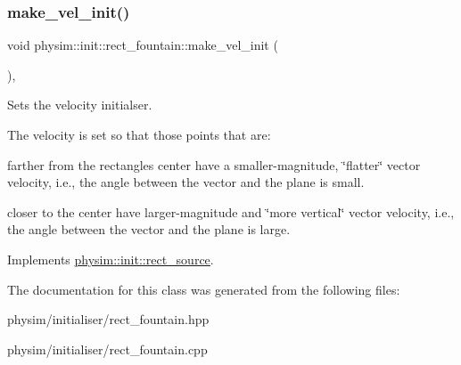 \subsubsection{\texorpdfstring{make\+\_\+vel\+\_\+init()}{make\_vel\_init()}}
{\footnotesize\ttfamily void physim\+::init\+::rect\+\_\+fountain\+::make\+\_\+vel\+\_\+init (\begin{DoxyParamCaption}{ }\end{DoxyParamCaption})\hspace{0.3cm}{\ttfamily [protected]}, {\ttfamily [virtual]}}



Sets the velocity initialser. 

The velocity is set so that those points that are\+:
\begin{DoxyItemize}
\item farther from the rectangle\textquotesingle{}s center have a smaller-\/magnitude, \char`\"{}flatter\char`\"{} vector velocity, i.\+e., the angle between the vector and the plane is small.
\item closer to the center have larger-\/magnitude and \char`\"{}more vertical\char`\"{} vector velocity, i.\+e., the angle between the vector and the plane is large. 
\end{DoxyItemize}

Implements \hyperlink{classphysim_1_1init_1_1rect__source_a3b825bcedd2d622dabc10aa6a1252cbf}{physim\+::init\+::rect\+\_\+source}.



The documentation for this class was generated from the following files\+:\begin{DoxyCompactItemize}
\item 
physim/initialiser/rect\+\_\+fountain.\+hpp\item 
physim/initialiser/rect\+\_\+fountain.\+cpp\end{DoxyCompactItemize}
